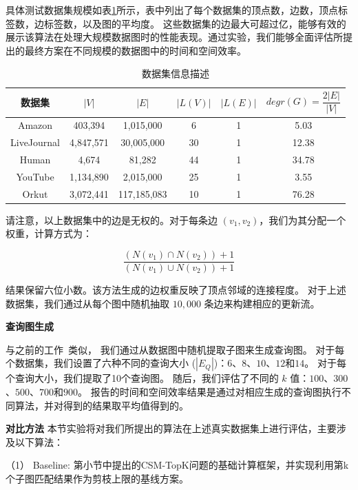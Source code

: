 具体测试数据集规模如表\ref{table:dataset}所示，表中列出了每个数据集的顶点数，边数，顶点标签数，边标签数，以及图的平均度。
这些数据集的边最大可超过亿，能够有效的展示该算法在处理大规模数据图时的性能表现。通过实验，我们能够全面评估所提出的最终方案在不同规模的数据图中的时间和空间效率。

\begin{table}[H]
    \centering
    \caption{数据集信息描述}
    \label{table:dataset}
    \begin{tabular}{cccccc}
        \toprule
        数据集   & $|V|$  & $|E|$ & $|L(V)|$ & $ |L(E)|$ & $degr(G)=\dfrac{2|E|}{|V|}$\\
        \midrule
        Amazon    & 403,394 & 1,015,000 & 6 & 1 & 5.03     \\ 
        LiveJournal   & 4,847,571 & 30,005,000 & 30 & 1 & 12.38 \\ 
        Human  & 4,674 & 81,282  & 44 & 1 & 34.78   \\ 
        YouTube  & 1,134,890 & 2,015,000 & 25 & 1 & 3.55  \\ 
        Orkut  & 3,072,441 & 117,185,083 & 10 & 1 & 76.28  \\ 
        \bottomrule
    \end{tabular}
\end{table}

请注意，以上数据集中的边是无权的。对于每条边 $(v_1, v_2)$，我们为其分配一个权重，计算方式为：

\[
    \frac{(N(v_1) \cap N(v_2)) + 1}{(N(v_1) \cup N(v_2)) + 1}
\]


结果保留六位小数。该方法生成的边权重反映了顶点邻域的连接程度。
对于上述数据集，我们通过从每个图中随机抽取 $10,000$ 条边来构建相应的更新流。


\textbf{查询图生成}
\label{ss-sec:querygen}

与之前的工作~\cite{csm-turboflux-DBLP:conf/sigmod/KimSHLHCSJ18,csm-symbi-DBLP:journals/pvldb/MinPPGIH21,csm-survey:DBLP:journals/pvldb/SunSLH22}类似，
我们通过从数据图中随机提取子图来生成查询图。
对于每个数据集，我们设置了六种不同的查询大小 ($|E_Q|$)：$6$、$8$、$10$、$12$和$14$。
对于每个查询大小，我们提取了10个查询图。
随后，我们评估了不同的 $k$ 值：$100$、$300$、$500$、$700$和$900$。
报告的时间和空间效率结果是通过对相应生成的查询图执行不同算法，并对得到的结果取平均值得到的。

\textbf{对比方法}
本节实验将对我们所提出的算法在上述真实数据集上进行评估，主要涉及以下算法：

（1） Baseline: 第\label{ch3:base-framework}小节中提出的CSM-TopK问题的基础计算框架，并实现利用第k个子图匹配结果作为剪枝上限的基线方案。

